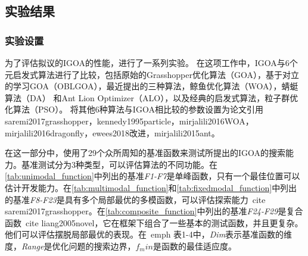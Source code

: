 \subsection{实验结果}
\subsubsection{实验设置}
为了评估拟议的IGOA的性能，进行了一系列实验。 在这项工作中，IGOA与6个元启发式算法进行了比较，包括原始的Grasshopper优化算法（GOA），基于对立的学习GOA（OBLGOA），最近提出的三种算法，鲸鱼优化算法（WOA），蜻蜓算法（DA） 和Ant Lion Optimizer（ALO），以及经典的启发式算法，粒子群优化算法（PSO）。 将其他6种算法与IGOA相比较的参数设置为论文引用{saremi2017grasshopper，kennedy1995particle，mirjalili2016WOA，mirjalili2016dragonfly，ewees2018改进，mirjalili2015ant}。

在这一部分中，使用了29个众所周知的基准函数来测试所提出的IGOA的搜索能力。基准测试分为3种类型，可以评估算法的不同功能。在\ref{tab:unimodal_function}中列出的基准\emph{F1-F7}是单峰函数，只有一个最佳位置可以估计开发能力。在\ref{tab:multimodal_function}和\ref{tab:fixedmodal_function}中列出的基准\emph{F8-F23}是具有多个局部最优的多模函数，可以评估探索能力\ cite {saremi2017grasshopper}。在\ref{tab:composite_function}中列出的基准\emph{F24-F29}是复合函数\ cite {liang2005novel}，它在框架下组合了一些基本的测试函数，并且更复杂。他们可以评估摆脱局部最优的表现。在\ emph {表1-4}中，\emph{Dim}表示基准函数的维度，\emph{Range}是优化问题的搜索边界，$ f_min $是函数的最佳适应度。

